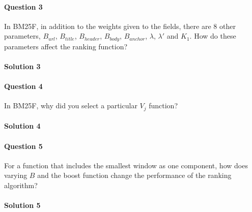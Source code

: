 \documentclass{article}
\begin{document}
\paragraph{Question 3}
In BM25F, in addition to the weights given to the fields, there are 8 other parameters, $B_{url}$, $B_{title}$, $B_{header}$, $B_{body}$, $B_{anchor}$, $\lambda$, $\lambda'$ and $K_1$. How do these parameters affect the ranking function?

\paragraph{Solution 3}

\paragraph{Question 4}
In BM25F, why did you select a particular $V_j$ function?

\paragraph{Solution 4}

\paragraph{Question 5}
For a function that includes the smallest window as one component, how does varying $B$ and the boost function change the performance of the ranking algorithm?

\paragraph{Solution 5}
\end{document}

